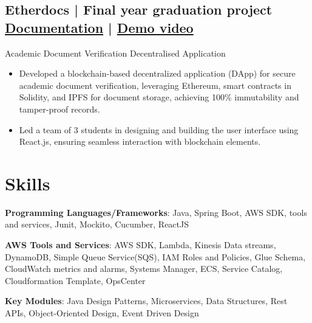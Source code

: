 \documentclass[a4,10pt]{article}
\newcommand{\subtext}[1]{
#1\par\vspace{-0.2cm}}
\newenvironment{zitemize}{
\begin{itemize}\itemsep0pt \parskip0pt \parsep1pt}
{\end{itemize}\vspace{-0.5cm}}
\begin{document}
\subsection*{Etherdocs | Final year graduation project \hfill {\href{https://github.com/DevelopersLeague/EtherDocs/blob/main/Readme.md}{Documentation}} | {\href{https://youtu.be/B_44aJ9hh6U?si=dGItpsQ3AEo_eIxk}{Demo video} }
}
\subtext{{\normalsize\normalfont Academic Document Verification Decentralised Application}}
    \begin{zitemize}
        \item Developed a blockchain-based decentralized application (DApp) for secure academic document verification, leveraging Ethereum, smart contracts in Solidity, and IPFS for document storage, achieving 100\% immutability and tamper-proof records.
        \item Led a team of 3 students in designing and building the user interface using React.js, ensuring seamless interaction with blockchain elements.
    \end{zitemize}



\section{Skills}
\textbf{Programming Languages/Frameworks}: Java, Spring Boot, AWS SDK, tools and services, Junit, Mockito, Cucumber, ReactJS 

\textbf{AWS Tools and Services}: AWS SDK, Lambda, Kinesis Data streams, DynamoDB, Simple Queue Service(SQS), IAM Roles and Policies, Glue Schema, CloudWatch metrics and alarms, Systems Manager, ECS, Service Catalog, Cloudformation Template, OpsCenter

\textbf{Key Modules}: Java Design Patterns, Microservices, Data Structures, Rest APIs, Object-Oriented Design, Event Driven Design
     

\end{document}
